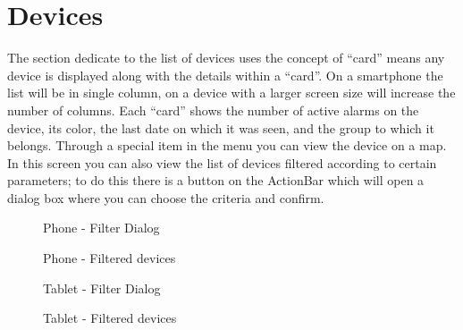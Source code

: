 


\chapter{Devices}
The section dedicate to the list of devices uses the concept of ``card'' means any device is displayed along with the details within a ``card''. On a smartphone the list will be in single column, on a device with a larger screen size will increase the number of columns. Each ``card'' shows the number of active alarms on the device, its color, the last date on which it was seen, and the group to which it belongs. Through a special item in the menu you can view the device on a map. \\ 
In this screen you can also view the list of devices filtered according to certain parameters; to do this there is a button on the ActionBar which will open a dialog box where you can choose the criteria and confirm.



	\begin{figure}[h!]
		  \centering
		  \caption{Phone - Filter Dialog}
	\end{figure}

	\begin{figure}[h!]
		  \centering
		  \caption{Phone - Filtered devices}
	\end{figure}

	\begin{figure}[h!]
		  \centering
		  \caption{Tablet - Filter Dialog}
	\end{figure}

	\begin{figure}[h!]
		  \centering
		  \caption{Tablet - Filtered devices}
	\end{figure}

